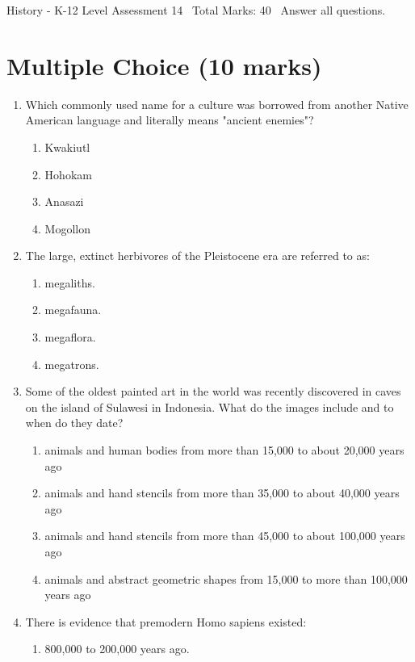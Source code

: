 \documentclass[12pt]{article}
\begin{document}
\begin{center}
History - K-12 Level Assessment 14 \
Total Marks: 40 \
Answer all questions.
\end{center}

\section*{Multiple Choice (10 marks)}
\begin{enumerate}[label=\arabic*.]
\item Which commonly used name for a culture was borrowed from another Native American language and literally means "ancient enemies"?
\begin{enumerate}[label=(\alph*)]
    \item Kwakiutl
    \item Hohokam
    \item Anasazi
    \item Mogollon
\end{enumerate}
\item The large, extinct herbivores of the Pleistocene era are referred to as:
\begin{enumerate}[label=(\alph*)]
    \item megaliths.
    \item megafauna.
    \item megaflora.
    \item megatrons.
\end{enumerate}
\item Some of the oldest painted art in the world was recently discovered in caves on the island of Sulawesi in Indonesia. What do the images include and to when do they date?
\begin{enumerate}[label=(\alph*)]
    \item animals and human bodies from more than 15,000 to about 20,000 years ago
    \item animals and hand stencils from more than 35,000 to about 40,000 years ago
    \item animals and hand stencils from more than 45,000 to about 100,000 years ago
    \item animals and abstract geometric shapes from 15,000 to more than 100,000 years ago
\end{enumerate}
\item There is evidence that premodern Homo sapiens existed:
\begin{enumerate}[label=(\alph*)]
    \item 800,000 to 200,000 years ago.

\end{enumerate}
\end{enumerate}
\end{document}
